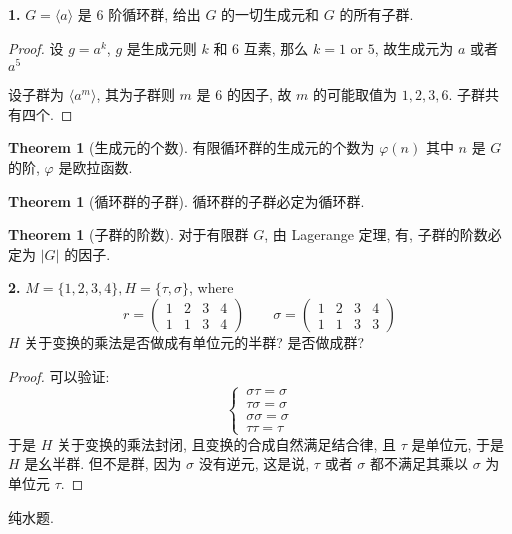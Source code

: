 \documentclass[12pt]{ctexart}
\theoremstyle{definition}
\newtheorem{thm}[definition]{Theorem}
\theoremstyle{remark}
\begin{document}
\noindent \textbf{1.} \(G = \langle a \rangle\) 是 \(6\) 阶循环群, 给出 \(G\) 的一切生成元和 \(G\) 的所有子群. 
\begin{proof}
	设 \(g = a ^{k}\), \(g\) 是生成元则 \(k\) 和 \(6\) 互素, 那么 \(k = 1 \text{ or } 5\), 故生成元为 \(a\) 或者 \(a ^{5}\)

	设子群为 \( \langle a^{m} \rangle\), 其为子群则 \(m\) 是 \(6\) 的因子, 故 \(m\) 的可能取值为 \(1 , 2, 3 , 6\). 
	子群共有四个. 
\end{proof}

\begin{thm}[生成元的个数]
\label{生成元的个数}
有限循环群的生成元的个数为 \( \varphi ( n)\) 其中 \(n\) 是 \(G\) 的阶, \( \varphi\) 是欧拉函数. 
\end{thm}

\begin{thm}[循环群的子群]
\label{循环群的子群}
循环群的子群必定为循环群. 
\end{thm}

\begin{thm}[子群的阶数]
\label{子群的阶数}
对于有限群 \(G\), 由 Lagerange 定理, 有, 子群的阶数必定为 \(|G|\) 的因子.
\end{thm}

\noindent \textbf{2. } \(M = \{ 1, 2 ,3 ,4 \} , H = \{ \tau , \sigma\}\), where 
\[
r = \left(
\begin{matrix}
	1 & 2 & 3 & 4 \\
	1 & 1 & 3 & 4
\end{matrix}
\right)
\qquad 
\sigma = \left(
\begin{matrix}
	1 & 2 & 3 & 4 \\
	1 & 1 & 3 & 3
\end{matrix}
\right)
\]
\( H\) 关于变换的乘法是否做成有单位元的半群? 是否做成群? 

\begin{proof}
可以验证:
\[
\begin{cases}
\, \sigma \tau =\sigma \\ 
\, \tau \sigma =\sigma \\ 
\, \sigma\sigma =\sigma \\ 
\, \tau \tau = \tau 
\end{cases}
\]
于是 \(H\) 关于变换的乘法封闭, 且变换的合成自然满足结合律, 且 \(\tau\) 是单位元, 于是 \(H\) 是幺半群. 但不是群, 因为 \(\sigma\) 没有逆元, 这是说, \( \tau \) 或者 \( \sigma \) 都不满足其乘以 \(\sigma\) 为单位元 \(\tau\).
\end{proof}
\medskip

\noindent 纯水题.
\end{document}

